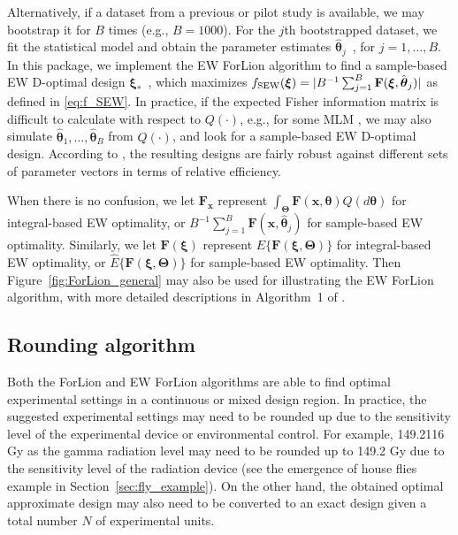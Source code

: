 Alternatively, if a dataset from a previous or pilot study is available, we may bootstrap it for $B$ times (e.g., $B=1000$). For the $j$th bootstrapped dataset, we fit the statistical model and obtain the parameter estimates   $\hat{\boldsymbol{\theta}}_j$~, for $j=1, \ldots, B$. In this package, we implement the EW ForLion algorithm to find a sample-based EW D-optimal design $\boldsymbol{\xi}_*$~, which maximizes $f_{\rm SEW}(\boldsymbol{\xi}) = |B^{-1} \sum_{j=1}^B {\mathbf F}(\boldsymbol{\xi}, \hat{\boldsymbol{\theta}}_j)|$ as defined in \eqref{eq:f_SEW}.
In practice, if the expected Fisher information matrix is difficult to calculate with respect to $Q(\cdot)$, e.g., for some MLM \citep{lin2025ew}, we may also simulate $\hat{\boldsymbol{\theta}}_1, \ldots, \hat{\boldsymbol{\theta}}_B$ from $Q(\cdot)$, and look for a sample-based EW D-optimal design. According to \cite{lin2025ew}, the resulting designs are fairly robust against different sets of parameter vectors in terms of relative efficiency.

When there is no confusion, we let ${\mathbf F}_{\mathbf x}$ represent $\int_{\boldsymbol{\Theta}} {\mathbf F}({\mathbf x}, \boldsymbol{\theta}) Q(d\boldsymbol{\theta})$ for integral-based EW optimality, or $B^{-1} \sum_{j=1}^B {\mathbf F}({\mathbf x}, \hat{\boldsymbol{\theta}}_j)$ for sample-based EW optimality. Similarly, we let ${\mathbf F}(\boldsymbol{\xi})$ represent $E\{{\mathbf F}(\boldsymbol{\xi}, \boldsymbol{\Theta})\}$ for integral-based EW optimality, or $\hat{E}\{{\mathbf F}(\boldsymbol{\xi}, \boldsymbol{\Theta})\}$ for sample-based EW optimality. Then Figure~\ref{fig:ForLion_general} may also be used for illustrating the EW ForLion algorithm, with more detailed descriptions in Algorithm~1 of \cite{lin2025ew}.

\subsection{Rounding algorithm}
\label{sec:rounding_algorithm}

Both the ForLion and EW ForLion algorithms are able to find optimal experimental settings in a continuous or mixed design region. In practice, the suggested experimental settings may need to be rounded up due to the sensitivity level of the experimental device or environmental control. For example, 149.2116 Gy as the gamma radiation level may need to be rounded up to 149.2 Gy due to the sensitivity level of the radiation device (see the emergence of house flies example in Section~\ref{sec:fly_example}). On the other hand, the obtained optimal approximate design may also need to be converted to an exact design given a total number $N$ of experimental units.  

